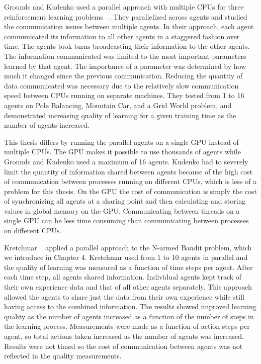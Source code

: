 Grounds and Kudenko used a parallel approach with multiple CPUs for three reinforcement learning problems ~\cite{Grounds:2008p3736}.  They parallelized across agents and studied the communication issues between multiple agents.  In their approach, each agent communicated its information to all other agents in a staggered fashion over time.  The agents took turns broadcasting their information to the other agents.  The information communicated was limited to the most important parameters learned by that agent.  The importance of a parameter was determined by how much it changed since the previous communication.  Reducing the quantity of data communicated was necessary due to the relatively slow communication speed between CPUs running on separate machines.  They tested from 1 to 16 agents on Pole Balancing, Mountain Car, and a Grid World problem, and demonstrated increasing quality of learning for a given training time as the number of agents increased.

This thesis differs by running the parallel agents on a single GPU instead of multiple CPUs.  The GPU makes it possible to use thousands of agents while Grounds and Kudenko used a maximum of 16 agents.  Kudenko had to severely limit the quantity of information shared between agents because of the high cost of communication between processes running on different CPUs, which is less of a problem for this thesis.  On the GPU the cost of communication is simply the cost of synchronizing all agents at a sharing point and then calculating and storing values in global memory on the GPU.  Communicating between threads on a single GPU can be less time consuming than communicating between processes on different CPUs.

Kretchmar ~\cite{Kretchmar:2002p3812} applied a parallel approach to the N-armed Bandit problem, which we introduce in Chapter 4.  Kretchmar used from 1 to 10 agents in parallel and the quality of learning was measured as a function of time steps per agent. After each time step, all agents shared information.  Individual agents kept track of their own experience data and that of all other agents separately.  This approach allowed the agents to share just the data from their own experience while still having access to the combined information.  The results showed improved learning quality as the number of agents increased as a function of the number of steps in the learning process.  Measurements were made as a function of action steps per agent, so total actions taken increased as the number of agents was increased.  Results were not timed so the cost of communication between agents was not reflected in the quality measurements.


